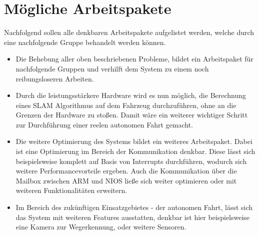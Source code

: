 \section{Mögliche Arbeitspakete}
Nachfolgend sollen alle denkbaren Arbeitspakete aufgelistet werden, welche durch eine nachfolgende Gruppe behandelt werden können.
\begin{itemize}
	\item Die Behebung aller oben beschriebenen Probleme, bildet ein Arbeitspaket für nachfolgende Gruppen und verhilft dem System zu einem noch reibungsloseren Arbeiten.
	\item Durch die leistungsstärkere Hardware wird es nun möglich, die Berechnung eines SLAM Algorithmus auf dem Fahrzeug durchzuführen, ohne an die Grenzen der Hardware zu stoßen. Damit wäre ein weiterer wichtiger Schritt zur Durchführung einer reelen autonomen Fahrt gemacht.
	\item Die weitere Optimierung des Systems bildet ein weiteres Arbeitspaket. Dabei ist eine Optimierung im Bereich der Kommunikation denkbar. Diese lässt sich beispielsweise komplett auf Basis von Interrupts durchführen, wodurch sich weitere Performancevorteile ergeben. Auch die Kommunikation über die Mailbox zwischen ARM und NIOS ließe sich weiter optimieren oder mit weiteren Funktionalitäten erweitern.
	\item Im Bereich des zukünftigen Einsatzgebietes - der autonomen Fahrt, lässt sich das System mit weiteren Features ausstatten, denkbar ist hier beispielsweise eine Kamera zur Wegerkennung, oder weitere Sensoren.
\end{itemize}